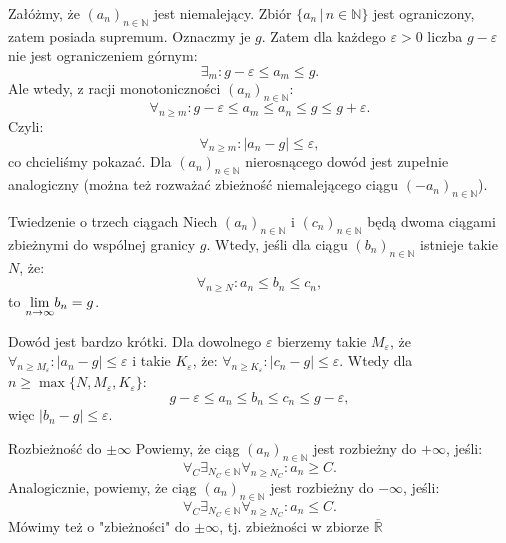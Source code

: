\documentclass{article}
\numberwithin{defi}{section}
\numberwithin{defi}{section}
\newcommand{\R}{\mathbb{R}}
\newcommand{\N}{\mathbb{N}}
\newcommand{\oo}{\infty}
\providecommand{\eps}{\varepsilon}
\newcommand{\ciag}[1]{(#1_{n})_{n \in \N}}
\newcommand{\lgras}[2]{\mathlarger{\lim}_{#1 \to \oo} #2_{#1}}
\begin{document}
\begin{dow}
    Załóżmy, że $\ciag{a}$ jest niemalejący. Zbiór $\{ a_n \, | \, n \in \N \}$ jest ograniczony, zatem posiada supremum. Oznaczmy je $g$. Zatem dla każdego $\eps > 0$ liczba $g - \eps$ nie jest ograniczeniem górnym: \begin{equation}
        \exists_m: g - \eps \leqslant a_m \leqslant g.
    \end{equation}
    Ale wtedy, z racji monotoniczności $\ciag{a}$: \begin{equation}
        \forall_{n \geqslant m}: g - \eps \leqslant a_m \leqslant a_n \leqslant g \leqslant g + \eps.
    \end{equation}
    Czyli:  \begin{equation}
        \forall_{n \geqslant m}: |a_n - g| \leqslant \eps,
    \end{equation}
    co chcieliśmy pokazać. Dla $\ciag{a}$ nierosnącego dowód jest zupełnie analogiczny (można też rozważać zbieżność niemalejącego ciągu $\ciag{-a}$).

\end{dow}


\begin{twier}{Twiedzenie  o trzech ciągach}
    Niech $\ciag{a}$ i $\ciag{c}$ będą dwoma ciągami zbieżnymi do wspólnej granicy $g$. Wtedy, jeśli dla ciągu $\ciag{b}$ istnieje takie $N$, że: \begin{equation}
        \forall_{n \geqslant N}: a_n \leqslant b_n \leqslant c_n,
    \end{equation}
    to $\lgras{n}{b} = g$.
\end{twier}

\begin{dow}
    Dowód jest bardzo krótki. Dla dowolnego $\eps$ bierzemy takie $M_{\eps}$, że $\forall_{n \geqslant M_{\eps}}: |a_n - g| \leqslant \eps $ i takie $K_{\eps}$, że: $\forall_{n \geqslant K_{\eps}}: |c_n - g| \leqslant \eps $. Wtedy dla $n \geqslant \max\{N, M_\eps, K_\eps \}$: \begin{equation}
        g - \eps \leqslant a_n \leqslant b_n \leqslant c_n \leqslant g - \eps,
    \end{equation}
    więc $|b_n - g| \leqslant \eps$.
\end{dow}



\begin{defr}{Rozbieżność do $\pm \oo$}
    Powiemy, że ciąg $\ciag{a}$ jest rozbieżny do $+\oo$, jeśli: \begin{equation}
        \forall_C \exists_{N_C \in \N} \forall_{n \geqslant N_C}: a_n \geqslant C.
    \end{equation}
    Analogicznie, powiemy, że ciąg $\ciag{a}$ jest rozbieżny do $-\oo$, jeśli: \begin{equation}
        \forall_C \exists_{N_C \in \N} \forall_{n \geqslant N_C}: a_n \leqslant C.
    \end{equation}
    Mówimy też o "zbieżności" do $\pm \oo$, tj. zbieżności w zbiorze $\overline{\R}$
\end{defr}
\end{document}
